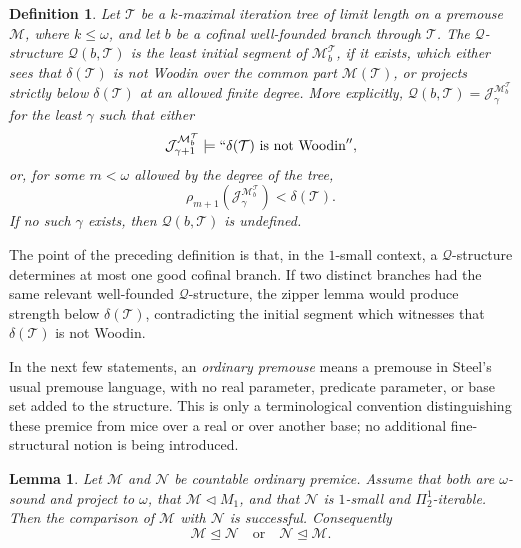 \documentclass[a4paper,11pt]{article}
\newtheorem{lemma}[theorem]{Lemma}
\newtheorem{definition}[theorem]{Definition}
\begin{document}
\begin{definition}\label{def:q-structures-local}
Let $\mathcal T$ be a $k$-maximal iteration tree of limit length on a premouse $\mathcal M$, where $k\leq\omega$, and let $b$ be a cofinal well-founded branch through $\mathcal T$.  The $\mathcal Q$-structure $\mathcal Q(b,\mathcal T)$ is the least initial segment of $\mathcal M_b^{\mathcal T}$, if it exists, which either sees that $\delta(\mathcal T)$ is not Woodin over the common part $\mathcal M(\mathcal T)$, or projects strictly below $\delta(\mathcal T)$ at an allowed finite degree.  More explicitly, $\mathcal Q(b,\mathcal T)=\mathcal J_\gamma^{\mathcal M_b^{\mathcal T}}$ for the least $\gamma$ such that either
\[
   \mathcal J_{\gamma+1}^{\mathcal M_b^{\mathcal T}}
      \models ``\delta(\mathcal T)\text{ is not Woodin}'',
\]
or, for some $m<\omega$ allowed by the degree of the tree,
\[
   \rho_{m+1}(\mathcal J_\gamma^{\mathcal M_b^{\mathcal T}})
      <\delta(\mathcal T).
\]
If no such $\gamma$ exists, then $\mathcal Q(b,\mathcal T)$ is undefined.
\end{definition}

The point of the preceding definition is that, in the $1$-small context, a $\mathcal Q$-structure determines at most one good cofinal branch.  If two distinct branches had the same relevant well-founded $\mathcal Q$-structure, the zipper lemma would produce strength below $\delta(\mathcal T)$, contradicting the initial segment which witnesses that $\delta(\mathcal T)$ is not Woodin.

In the next few statements, an \emph{ordinary premouse} means a premouse in Steel's usual premouse language, with no real parameter, predicate parameter, or base set added to the structure.  This is only a terminological convention distinguishing these premice from mice over a real or over another base; no additional fine-structural notion is being introduced.

\begin{lemma}\label{lem:local-comparison-m1}
Let $\mathcal M$ and $\mathcal N$ be countable ordinary premice.  Assume that both are $\omega$-sound and project to $\omega$, that $\mathcal M\triangleleft M_1$, and that $\mathcal N$ is $1$-small and $\Pi^1_2$-iterable.  Then the comparison of $\mathcal M$ with $\mathcal N$ is successful.  Consequently
\[
   \mathcal M\trianglelefteq\mathcal N
   \quad\text{or}\quad
   \mathcal N\trianglelefteq\mathcal M.
\]
\end{lemma}
\end{document}
